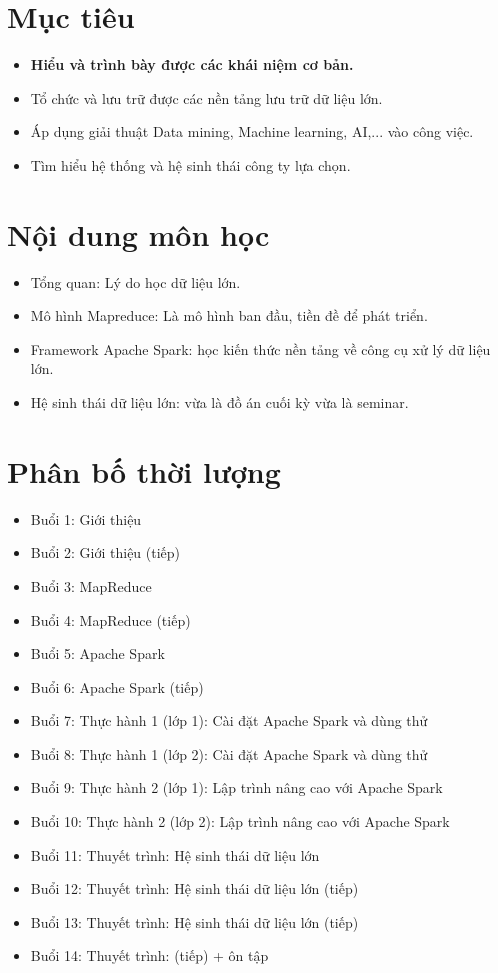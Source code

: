 \section{ Mục tiêu }
\begin{itemize}
    \item \textbf{Hiểu và trình bày được các khái niệm cơ bản.}
    \item Tổ chức và lưu trữ được các nền tảng lưu trữ dữ liệu lớn.
    \item Áp dụng giải thuật Data mining, Machine learning, AI,... vào công việc.
    \item Tìm hiểu hệ thống và hệ sinh thái công ty lựa chọn.
\end{itemize}
\section{ Nội dung môn học }
\begin{itemize}
	\item Tổng quan: Lý do học dữ liệu lớn.
	\item Mô hình Mapreduce: Là mô hình ban đầu, tiền đề để phát triển.
	\item Framework Apache Spark: học kiến thức nền tảng về công cụ xử lý dữ 
	liệu lớn.
	\item Hệ sinh thái dữ liệu lớn: vừa là đồ án cuối kỳ vừa là seminar.
\end{itemize}
\section{ Phân bố thời lượng }
\begin{itemize}
	\item Buổi 1: Giới thiệu
	\item Buổi 2: Giới thiệu (tiếp)
	\item Buổi 3: MapReduce
	\item Buổi 4: MapReduce (tiếp)
	\item Buổi 5: Apache Spark
	\item Buổi 6: Apache Spark (tiếp)
	\item Buổi 7: Thực hành 1 (lớp 1): Cài đặt Apache Spark và dùng thử
	\item Buổi 8: Thực hành 1 (lớp 2): Cài đặt Apache Spark và dùng thử
	\item Buổi 9: Thực hành 2 (lớp 1): Lập trình nâng cao với Apache Spark
	\item Buổi 10: Thực hành 2 (lớp 2): Lập trình nâng cao với Apache Spark
	\item Buổi 11: Thuyết trình: Hệ sinh thái dữ liệu lớn
	\item Buổi 12: Thuyết trình: Hệ sinh thái dữ liệu lớn (tiếp)
	\item Buổi 13: Thuyết trình: Hệ sinh thái dữ liệu lớn (tiếp)
	\item Buổi 14: Thuyết trình: (tiếp) + ôn tập
\end{itemize}
